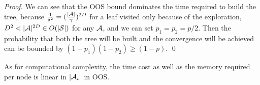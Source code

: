 {\begin{proof}
We can see that the OOS bound dominates the time required to build the tree, because $\frac{1}{\delta^2}=(\frac{|\mathcal{A}|}{\gamma})^{2D}$ for a leaf visited only because of the exploration, $D^2 < |\mathcal{A}|^{2D} \in O(|\mathcal{S}|)$ for any $\mathcal{A}$, and we can set $p_1=p_2=p/2$. Then the probability that both the tree will be built and the convergence will be achieved can be bounded by $(1-p_1)(1-p_2) \geq (1-p)$. \qed
\end{proof}
As for computational complexity, the time cost as well as the memory required per node is linear in $|\mathcal{A}_i|$ in OOS.

}

%
%

